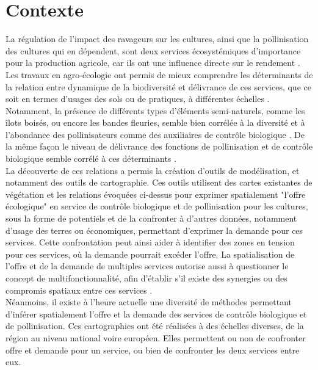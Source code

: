 \documentclass[11pt,a4paper,final]{article}
\author{Antoine}
\begin{document}
\section{Contexte}

La régulation de l'impact des ravageurs sur les cultures, ainsi que la pollinisation des cultures qui en dépendent, sont deux services écosystémiques d'importance pour la production agricole, car ils ont une influence directe sur le rendement \cite{oerke_crop_2006,garibaldi_global_2011}.\\

Les travaux en agro-écologie ont permis de mieux comprendre les déterminants de la relation entre dynamique de la biodiversité et délivrance de ces services, que ce soit en termes d'usages des sols ou de pratiques, à différentes échelles \cite{liere_intersection_2017}. Notamment, la présence de différents types d'éléments semi-naturels, comme les îlots boisés, ou encore les bandes fleuries, semble bien corrélée à la diversité et à l'abondance des pollinisateurs comme des auxiliaires de contrôle biologique \cite{chaplin-kramer_meta-analysis_2011, kennedy_global_2013, shackelford_comparison_2013}. De la même façon le niveau de délivrance des fonctions de pollinisation et de contrôle biologique semble corrélé à ces déterminants \cite{liere_intersection_2017}.\\

La découverte de ces relations a permis la création d'outils de modélisation, et notamment des outils de cartographie. Ces outils utilisent des cartes existantes de végétation et les relations évoquées ci-dessus pour exprimer spatialement  "l'offre écologique" en service de contrôle biologique et de pollinisation pour les cultures, sous la forme de potentiels  \cite{zulian_linking_2013} et de la confronter à d'autres données, notamment d'usage des terres ou économiques, permettant d'exprimer la demande pour ces services. Cette confrontation peut ainsi aider à identifier des zones en tension pour ces services, où la demande pourrait excéder l'offre. La spatialisation de l'offre et de la demande de multiples services autorise aussi à questionner le concept de multifonctionnalité, afin d'établir s'il existe des synergies ou des compromis spatiaux entre ces services \cite{mouchet_spatially_2013}.\\

Néanmoins, il existe à l'heure actuelle une diversité de méthodes permettant d'inférer spatialement l'offre et la demande des services de contrôle biologique et de pollinisation. Ces cartographies ont été réalisées à des échelles diverses, de la région au niveau national voire européen. Elles permettent ou non de confronter offre et demande pour un service, ou bien de confronter les deux services entre eux. \\
\end{document}
